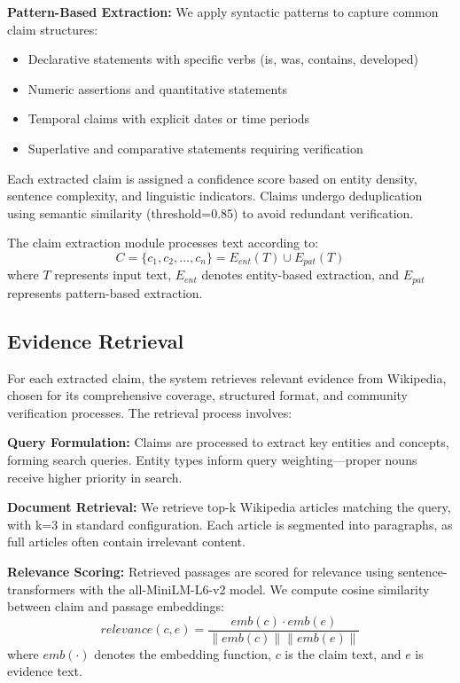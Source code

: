 \documentclass[conference]{IEEEtran}
\begin{document}
\textbf{Pattern-Based Extraction:} We apply syntactic patterns to capture common claim structures:
\begin{itemize}
\item Declarative statements with specific verbs (is, was, contains, developed)
\item Numeric assertions and quantitative statements
\item Temporal claims with explicit dates or time periods
\item Superlative and comparative statements requiring verification
\end{itemize}

Each extracted claim is assigned a confidence score based on entity density, sentence complexity, and linguistic indicators. Claims undergo deduplication using semantic similarity (threshold=0.85) to avoid redundant verification.

The claim extraction module processes text according to:
\begin{equation}
C = \{c_1, c_2, ..., c_n\} = E_{ent}(T) \cup E_{pat}(T)
\end{equation}
where $T$ represents input text, $E_{ent}$ denotes entity-based extraction, and $E_{pat}$ represents pattern-based extraction.

\subsection{Evidence Retrieval}

For each extracted claim, the system retrieves relevant evidence from Wikipedia, chosen for its comprehensive coverage, structured format, and community verification processes. The retrieval process involves:

\textbf{Query Formulation:} Claims are processed to extract key entities and concepts, forming search queries. Entity types inform query weighting—proper nouns receive higher priority in search.

\textbf{Document Retrieval:} We retrieve top-k Wikipedia articles matching the query, with k=3 in standard configuration. Each article is segmented into paragraphs, as full articles often contain irrelevant content.

\textbf{Relevance Scoring:} Retrieved passages are scored for relevance using sentence-transformers with the all-MiniLM-L6-v2 model. We compute cosine similarity between claim and passage embeddings:
\begin{equation}
relevance(c, e) = \frac{emb(c) \cdot emb(e)}{\|emb(c)\| \|emb(e)\|}
\end{equation}
where $emb(\cdot)$ denotes the embedding function, $c$ is the claim text, and $e$ is evidence text.
\end{document}
